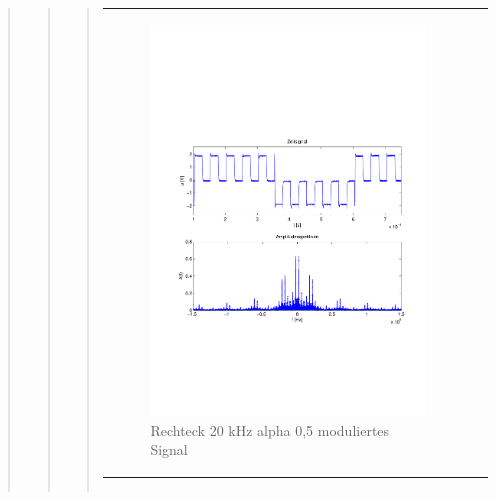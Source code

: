 \begin{quote}
\begin{quote}
\begin{quote}
\begin{center}
\begin{tabular}{ll}
                \begin{minipage}{0.6\textwidth}
                    \begin{figure}[H]
                        \includegraphics[scale=0.55, trim = 16mm 70mm 16mm 85mm, clip]{Bilder/flatrec20_05abget_zeit}
                       \caption{Rechteck 20 kHz alpha 0,5 moduliertes Signal}
		              \label{fig:flatrec20_05zeit}
                    \end{figure}
                \end{minipage}
            
            \end{tabular}
            \end{center}
            
            \begin{center}
            \begin{tabular}{ll}
            

\end{tabular}
\end{center}
\end{quote}
\end{quote}
\end{quote}
